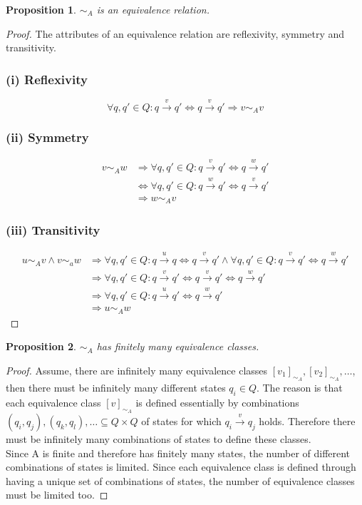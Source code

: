 \documentclass[a4paper,11pt]{article}
\renewcommand{\to}{\longrightarrow}
\newcounter{sheet}
\newtheorem{proposition}{Proposition}[sheet]
\begin{document}
\begin{proposition}
$\sim_A$ is an equivalence relation.
\end{proposition}
\begin{proof} The attributes of an equivalence relation are reflexivity, symmetry and transitivity. \\
\subsubsection*{(i) Reflexivity}
\[\forall q,q' \in Q: q \overset{v}{\rightarrow} q' \Leftrightarrow q \overset{v}{\to} q' \Rightarrow v \sim_A v\]

\subsubsection*{(ii) Symmetry}
\begin{align*}
v \sim_A w &\Rightarrow \forall q,q' \in Q: q \overset{v}{\to} q' \Leftrightarrow  q \overset{w}{\to} q' \\
&\Leftrightarrow \forall q,q' \in Q: q \overset{w}{\to} q' \Leftrightarrow  q \overset{v}{\to} q' \\
& \Rightarrow w \sim_A v
\end{align*}

\subsubsection*{(iii) Transitivity}
\begin{align*}
u \sim_A v \land v \sim_a w &\Rightarrow \forall q,q' \in Q: q \overset{u}{\to} q \Leftrightarrow  q \overset{v}{\to} q'  \land \forall q,q' \in Q: q \overset{v}{\to} q' \Leftrightarrow  q \overset{w}{\to} q' \\
& \Rightarrow \forall q,q' \in Q: q \overset{v}{\to} q' \Leftrightarrow q \overset{v}{\to} q' \Leftrightarrow  q \overset{w}{\to} q' \\
& \Rightarrow \forall q,q' \in Q: q \overset{u}{\to} q' \Leftrightarrow  q \overset{w}{\to} q' \\
& \Rightarrow u \sim_A w
\end{align*}
\end{proof}

\begin{proposition}
$\sim_A$ has finitely many equivalence classes.
\end{proposition}
\begin{proof}
Assume, there are infinitely many equivalence classes $[v_1]_{\sim_A},[v_2]_{\sim_A},\dots$, then there must be infinitely many different states $q_i \in Q$. The reason is that each equivalence class $[v]_{\sim_A}$ is defined essentially by combinations $(q_i,q_j),(q_k,q_l),\dots \subseteq Q\times Q$ of states for which $q_i \overset{v}{\to} q_j$ holds. Therefore there must be infinitely many combinations of states to define these classes. \\  
Since A is finite and therefore has finitely many states, the number of different combinations of states is limited. Since each equivalence class is defined through having a unique set of combinations of states, the number of equivalence classes must be limited too.
\end{proof}
\end{document}
